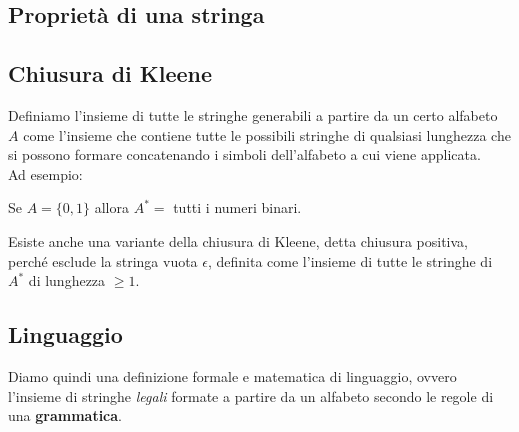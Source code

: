 \documentclass{article}
\begin{document}
\subsection*{Proprietà di una stringa}
\subsection*{Chiusura di Kleene}
Definiamo l'insieme di tutte le stringhe generabili a partire da un certo alfabeto \(A\) come l'insieme che contiene tutte le possibili stringhe di qualsiasi lunghezza che si possono formare concatenando i simboli dell'alfabeto a cui viene applicata. \\
Ad esempio:
\begin{center}
  Se \(A = \{ 0, 1 \}\) allora \(A^* = \) tutti i numeri binari.
\end{center}
Esiste anche una variante della chiusura di Kleene, detta chiusura positiva, perché esclude la stringa vuota \(\epsilon\), definita come l'insieme di tutte le stringhe di \(A^*\) di lunghezza \(\geq 1\).
\subsection*{Linguaggio}
Diamo quindi una definizione formale e matematica di linguaggio, ovvero l'insieme di stringhe \emph{legali} formate a partire da un alfabeto secondo le regole di una \textbf{grammatica}.
\end{document}
